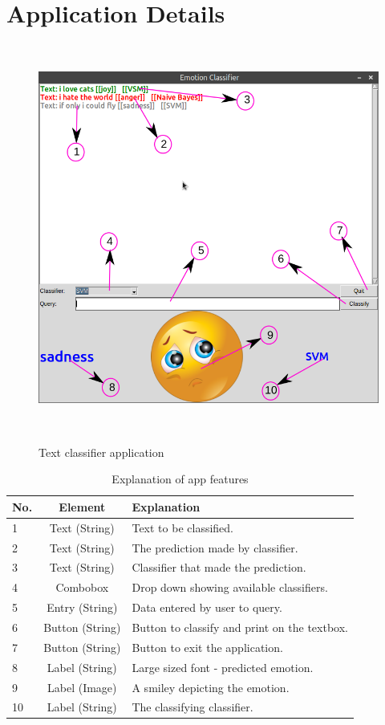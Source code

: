 \section{Application Details}
\vspace*{-1cm}
\begin{figure}[ht!]
 \centering
 \caption{Text classifier application}
 \includegraphics[width=5in,height=5in]{app} 
 \label{fig-app-shot}
\end{figure}
\vspace*{-0.5cm}
\begin{table}[ht!]
\centering
\label{tab-app-exp}
\begin{tabular}{l|c|l}
\textbf{No.} & \textbf{Element} & \textbf{Explanation}\\
\hline
1 & Text (String) & Text to be classified. \\
2 & Text (String) & The prediction made by classifier. \\
3 & Text (String) & Classifier that made the prediction. \\
4 & Combobox & Drop down showing available classifiers. \\
5 & Entry (String) & Data entered by user to query. \\
6 & Button (String) & Button to classify and print on the textbox. \\
7 & Button (String) & Button to exit the application. \\
8 & Label (String) & Large sized font - predicted emotion. \\
9 & Label (Image) & A smiley depicting the emotion. \\
10 & Label (String) & The classifying classifier. \\
\end{tabular}
\caption{Explanation of app features}
\end{table}

